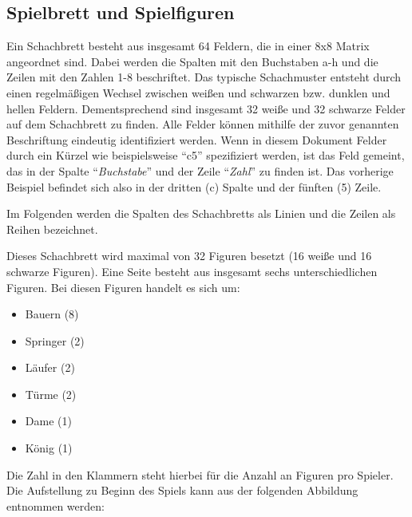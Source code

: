 \documentclass[a4paper,12pt]{article}
\providecommand{\tightlist}{%
      \setlength{\itemsep}{0pt}\setlength{\parskip}{0pt}}
\begin{document}
    \hypertarget{spielbrett-und-spielfiguren}{%
\subsection{Spielbrett und
Spielfiguren}\label{spielbrett-und-spielfiguren}}

Ein Schachbrett besteht aus insgesamt 64 Feldern, die in einer 8x8
Matrix angeordnet sind. Dabei werden die Spalten mit den Buchstaben a-h
und die Zeilen mit den Zahlen 1-8 beschriftet. Das typische Schachmuster
entsteht durch einen regelmäßigen Wechsel zwischen weißen und schwarzen
bzw. dunklen und hellen Feldern. Dementsprechend sind insgesamt 32 weiße
und 32 schwarze Felder auf dem Schachbrett zu finden. Alle Felder können
mithilfe der zuvor genannten Beschriftung eindeutig identifiziert
werden. Wenn in diesem Dokument Felder durch ein Kürzel wie
beispielsweise ``c5'' spezifiziert werden, ist das Feld gemeint, das in
der Spalte ``\emph{Buchstabe}'' und der Zeile ``\emph{Zahl}'' zu finden
ist. Das vorherige Beispiel befindet sich also in der dritten (c) Spalte
und der fünften (5) Zeile.

Im Folgenden werden die Spalten des Schachbretts als Linien und die
Zeilen als Reihen bezeichnet.

Dieses Schachbrett wird maximal von 32 Figuren besetzt (16 weiße und 16
schwarze Figuren). Eine Seite besteht aus insgesamt sechs
unterschiedlichen Figuren. Bei diesen Figuren handelt es sich um:

\begin{itemize}
\tightlist
\item
  Bauern (8)
\item
  Springer (2)
\item
  Läufer (2)
\item
  Türme (2)
\item
  Dame (1)
\item
  König (1)
\end{itemize}

Die Zahl in den Klammern steht hierbei für die Anzahl an Figuren pro
Spieler. Die Aufstellung zu Beginn des Spiels kann aus der folgenden
Abbildung entnommen werden:
\end{document}

